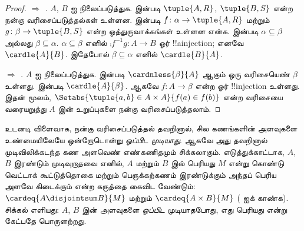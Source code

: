 \documentclass[../../../include/open-logic-section]{subfiles}
\begin{document}
\begin{proof}
\emph{ $\Rightarrow$ .}
$A$, $B$ ஐ நிலைப்படுத்துக.  இன்படி
$\tuple{A, R}$, $\tuple{B, S}$ என்ற நன்கு வரிசைப்படுத்தல்கள்
உள்ளன. 
இன்படி $f \colon \alpha \to \tuple{A, R}$ மற்றும்
$g \colon \beta \to \tuple{B, S}$ என்ற ஒத்துருவாக்கங்கள்
உள்ளன என்க. 
இன்படி $\alpha \subseteq \beta$ அல்லது
$\beta \subseteq \alpha$. $\alpha \subseteq \beta$
எனில் $\comp{f^{-1}}{g} \colon A \to B$ ஓர்
!!a{injection}; எனவே $\cardle{A}{B}$. இதேபோல்
$\beta \subseteq \alpha$ எனில் $\cardle{B}{A}$.

\emph{ $\Rightarrow$ .}
$A$ ஐ நிலைப்படுத்துக.  இன்படி
$\cardnless{\beta}{A}$ ஆகும் ஒரு வரிசையெண் $\beta$
உள்ளது.  இன்படி
$\cardle{A}{\beta}$. ஆகவே $f \colon A \to \beta$
என்ற ஓர் !!{injection} உள்ளது. இதன் மூலம்,
$\Setabs{\tuple{a, b} \in A \times A}{f(a) \in f(b)}$
என்ற வரிசையை வரையறுத்து $A$ இன் உறுப்புகளை நன்கு
வரிசைப்படுத்தலாம்.
\end{proof}
\noindent

உடனடி விளைவாக, நன்கு வரிசைப்படுத்தல் தவறினால்,
சில கணங்களின் அளவுகளை உண்மையிலேயே ஒன்றோடொன்று
\emph{ஒப்பிட முடியாது}. ஆகவே அது தவறினால் முடிவிலிக்கடந்த
கண அளவெண் எண்கணிதமும் சிக்கலாகும். எடுத்துக்காட்டாக,
$A$, $B$ இரண்டும் முடிவுறாதவை எனில், $A$ மற்றும் $B$ இல்
பெரியது $M$
என்று கொண்டு வெட்டாக் கூட்டுத்தொகை மற்றும் பெருக்கற்கணம்
இரண்டுக்கும் அந்தப் பெரிய அளவே கிடைக்கும் என்ற கருத்தை
கைவிட வேண்டும்:
$\cardeq{A \disjointsum B}{M}$ மற்றும்
$\cardeq{A \times B}{M}$
( ஐக் காண்க).
சிக்கல் எளியது: $A$, $B$ இன் அளவுகளை \emph{ஒப்பிட}
முடியாதபோது, எது பெரியது என்று கேட்பதே பொருளற்றது.
\end{document}
